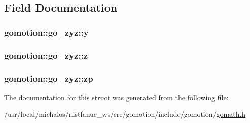 \subsection{Field Documentation}
\hypertarget{structgomotion_1_1go__zyz_a05cbc6e6ea8660a5d3e64eedea4e9fb7}{
\subsubsection[{y}]{ gomotion\-::go\-\_\-zyz\-::y}}\label{structgomotion_1_1go__zyz_a05cbc6e6ea8660a5d3e64eedea4e9fb7}
\hypertarget{structgomotion_1_1go__zyz_a87a0a9e59da539abece916a52c8b3d28}{
\subsubsection[{z}]{ gomotion\-::go\-\_\-zyz\-::z}}\label{structgomotion_1_1go__zyz_a87a0a9e59da539abece916a52c8b3d28}
\hypertarget{structgomotion_1_1go__zyz_a43a807cde8f59f25403e282390331001}{
\subsubsection[{zp}]{ gomotion\-::go\-\_\-zyz\-::zp}}\label{structgomotion_1_1go__zyz_a43a807cde8f59f25403e282390331001}


The documentation for this struct was generated from the following file\-:\begin{DoxyCompactItemize}
\item 
/usr/local/michalos/nistfanuc\-\_\-ws/src/gomotion/include/gomotion/\hyperlink{gomath_8h}{gomath.\-h}\end{DoxyCompactItemize}
